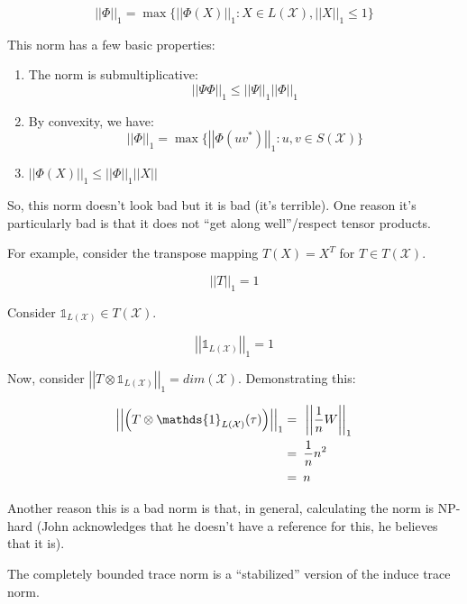 \documentclass{article}
\begin{document}
\[
    \left| \left| \Phi  \right| \right|_1 = \max \{ \left| \left| \Phi(X) \right|
            \right|_1 : X \in L(\mathcal{X}), \left| \left| X \right| \right|_1
    \le 1 \}
\]

This norm has a few basic properties:

\begin{enumerate}
    \item The norm is submultiplicative:
        \[
            \left| \left| \Psi \Phi \right| \right|_1 \le \left| \left| \Psi
            \right| \right|_1 \left| \left| \Phi \right| \right|_1
        \]
    \item By convexity, we have:
        \[ 
            \left| \left| \Phi \right| \right|_1 = \max \{\left| \left|
            \Phi(uv^*) \right| \right|_1 : u,v \in S(\mathcal{X}) \}
        \]
    \item $ \left| \left| \Phi(X) \right| \right|_1 \le \left| \left| \Phi
        \right| \right|_1 \left| \left| X \right| \right| $ 
\end{enumerate}

So, this norm doesn't look bad but it is bad (it's terrible). One reason it's
particularly bad is that it does not ``get along well''/respect tensor products.

For example, consider the transpose mapping $T(X)=X^T$ for $T \in
T(\mathcal{X})$.

\[ 
    \left| \left| T \right| \right|_1 = 1 
\]

Consider $\mathds{1}_{L(\mathcal{X})} \in T(\mathcal{X})$.

\[ 
    \left| \left| \mathds{1}_{L(\mathcal{X})} \right| \right|_1 = 1 
\]

Now, consider $\left| \left| T \otimes \mathds{1}_{L(\mathcal{X})} \right|
\right|_1 = dim(\mathcal{X})$. Demonstrating this:

\begin{align*}
    \left| \left| \left( T \otimes \mathds{1}_{L(\mathcal{X})} (\tau) \right)
    \right| \right|_1 =& \enskip \left| \left| \frac{1}{n} W \right| \right|_1 \\
            =& \enskip \frac{1}{n} n^2 \\
            =& \enskip n
\end{align*}

Another reason this is a bad norm is that, in general, calculating the norm is
NP-hard (John acknowledges that he doesn't have a reference for this, he
believes that it is).

The completely bounded trace norm is a ``stabilized'' version of the induce
trace norm.
\end{document}
